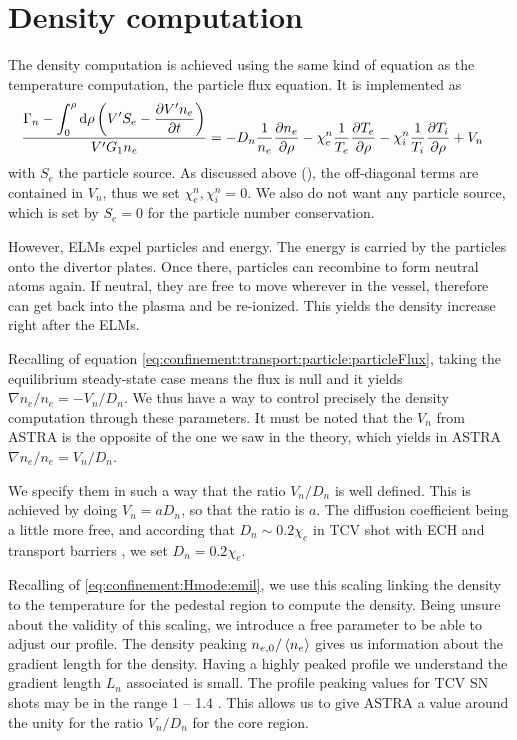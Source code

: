\section{Density computation}\label{sec:sim:n}
The density computation is achieved using the same kind of equation as the temperature computation, the particle flux equation. It is implemented as
\begin{align*}
	\frac{\Gamma_n - \displaystyle\int_0^{\rho} \textrm{d} \rho \left( V' S_e - \dfrac{\partial V' n_e}{\partial t} \right)}{V' G_1 n_e} & = - D_n \frac{1}{n_e} \dfrac{\partial n_e}{\partial \rho} - \chi^n_e \frac{1}{T_e} \dfrac{\partial T_e}{\partial \rho} - \chi^n_i \frac{1}{T_i} \dfrac{\partial T_i}{\partial \rho} + V_n
\end{align*}
with $S_e$ the particle source. As discussed above (), the off-diagonal terms are contained in $V_n$, thus we set $\chi_e^n, \chi_i^n = 0$. We also do not want any particle source, which is set by $S_e = 0$ for the particle number conservation.

However, ELMs expel particles and energy. The energy is carried by the particles onto the divertor plates. Once there, particles can recombine to form neutral atoms again. If neutral, they are free to move wherever in the vessel, therefore can get back into the plasma and be re-ionized. This yields the density increase right after the ELMs.

Recalling of equation \eqref{eq:confinement:transport:particle:particleFlux}, taking the equilibrium steady-state case means the flux is null and it yields $\nabla n_e / n_e = - V_n / D_n$. We thus have a way to control precisely the density computation through these parameters. It must be noted that the $V_n$ from ASTRA is the opposite of the one we saw in the theory, which yields in ASTRA $\nabla n_e / n_e = V_n / D_n$.

We specify them in such a way that the ratio $V_n / D_n$ is well defined. This is achieved by doing $V_n = a D_n$, so that the ratio is $a$. The diffusion coefficient being a little more free, and according that $D_n \sim 0.2 \chi_e$ in TCV shot with ECH and transport barriers \cite{fable2009}, we set $D_n = 0.2 \chi_e$.

Recalling of \eqref{eq:confinement:Hmode:emil}, we use this scaling linking the density to the temperature for the pedestal region to compute the density. Being unsure about the validity of this scaling, we introduce a free parameter to be able to adjust our profile. The density peaking $n_{e,0} / \left\langle n_e \right\rangle$ gives us information about the gradient length for the density. Having a highly peaked profile we understand the gradient length $L_n$ associated is small. The profile peaking values for TCV SN shots may be in the range 1 -- 1.4 \cite{andreas2010}. This allows us to give ASTRA a value around the unity for the ratio $V_n / D_n$ for the core region.

